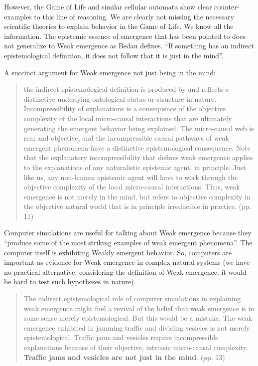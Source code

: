 \documentclass{article}
\newcommand{\tb}[1]{\textbf{#1}}
\begin{document}
However, the Game of Life and similar cellular automata show clear counter-examples to this line of reasoning. We are clearly not missing the necessary scientific theories to explain behavior in the Game of Life. We know all the information. The epistemic essence of emergence that has been pointed to does not generalize to Weak emergence as Bedau defines. ``If something has an indirect epistemological definition, it does not follow that it is just in the mind''.

A succinct argument for Weak emergence not just being in the mind:
\begin{quote}
    the indirect epistemological definition is produced by and reflects a distinctive underlying ontological status or structure in nature. Incompressibility of explanations is a consequence of the objective complexity of the local micro-causal interactions that are ultimately generating the emergent behavior being explained. The micro-causal web is real and objective, and the incompressible causal pathways of weak emergent phenomena have a distinctive epistemological consequence. Note that the explanatory incompressibility that defines weak emergence applies to the explanations of any naturalistic epistemic agent, in principle. Just like us, any non-human epistemic agent will have to work through the objective complexity of the local micro-causal interactions. Thus, weak emergence is not merely in the mind, but refers to objective complexity in the objective natural world that is in principle irreducible in practice. (pp. 11)
\end{quote}

Computer simulations are useful for talking about Weak emergence because they ``produce some of the most striking examples of weak emergent phenomena''. The computer itself is exhibiting Weakly emergent behavior. So, computers are important as evidence for Weak emergence in complex natural systems (we have no practical alternative, considering the definition of Weak emergence. it would be hard to test such hypotheses in nature).

\begin{quote}
The indirect epistemological role of computer simulations in explaining weak emergence might fuel a revival of the belief that weak emergence is in some sense merely epistemological. But this would be a mistake. The weak emergence exhibited in jamming traffic and dividing vesicles is not merely epistemological. Traffic jams and vesicles require incompressible explanations because of their objective, intrinsic micro-causal complexity. \tb{Traffic jams and vesicles are not just in the mind}. (pp. 13)
\end{quote}
\end{document}
